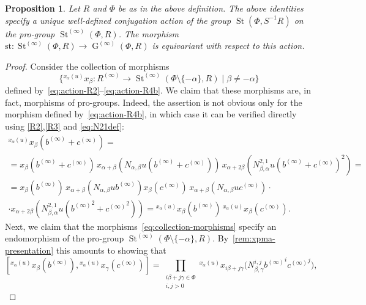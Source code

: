 \documentclass[oneside, 11pt]{amsart}
\numberwithin{equation}{section}
\newtheorem{prop}[lemma]{Proposition}
\theoremstyle{definition}
\theoremstyle{remark}
\DeclareMathOperator\St{St}
\DeclareMathOperator\GG{G}
\newcommand{\up}[2]{{^{#1}\!{#2}}}
\begin{document}
\begin{prop}\label{SteinbergLocalAction}
 Let $R$ and $\Phi$ be as in the above definition.
 The above identities specify a unique well-defined conjugation action of the group \(\St(\Phi, S^{-1} R)\) on the pro-group \(\St^{(\infty)}(\Phi, R)\).
 The morphism \(\mathrm{st} \colon \St^{(\infty)}(\Phi, R) \to \GG^{(\infty)}(\Phi, R)\) is equivariant with respect to this action.
\end{prop}
\begin{proof}
 Consider the collection of morphisms \begin{equation} \label{eq:collection-morphisms} \{\up{x_\alpha(u)} x_\beta \colon R^{(\infty)} \to \St^{(\infty)}(\Phi\setminus\{-\alpha\}, R) \mid \beta \neq - \alpha \}\end{equation} defined by~\eqref{eq:action-R2}--\eqref{eq:action-R4b}. We claim that these morphisms are, in fact, morphisms of pro-groups. Indeed, the assertion is not obvious only for the morphism defined by~\eqref{eq:action-R4b}, in which case it can be verified directly using \eqref{R2},\eqref{R3} and \eqref{eq:N21def}:
 \begin{multline*}
 \up{x_\alpha(u)}{x_\beta(b^{(\infty)} + c^{(\infty)})} = \\
 = x_\beta(b^{(\infty)} + c^{(\infty)})\, x_{\alpha + \beta}(N_{\alpha, \beta} u (b^{(\infty)} + c^{(\infty)}))\, x_{\alpha + 2\beta}(N_{\beta, \alpha}^{2, 1} u (b^{(\infty)} + c^{(\infty)})^2) = \\
 = x_\beta(b^{(\infty)})\, x_{\alpha + \beta}(N_{\alpha, \beta} u b^{(\infty)}) x_\beta(c^{(\infty)})\, x_{\alpha + \beta}(N_{\alpha, \beta} u c^{(\infty)}) \cdot \\
 \cdot x_{\alpha + 2\beta}(N_{\beta, \alpha}^{2, 1} u ({b^{(\infty)}}^2 + {c^{(\infty)}}^2)) = \up{x_\alpha(u)}{x_\beta(b^{(\infty)})}\, \up{x_\alpha(u)}{x_\beta(c^{(\infty)})}.
 \end{multline*}
 Next, we claim that the morphisms~\eqref{eq:collection-morphisms} specify an endomorphism of the pro-group $\St^{(\infty)}(\Phi\setminus\{-\alpha\}, R)$. By~\cref{rem:xpma-presentation} this amounts to showing that \begin{equation}\label{eq:main-equation}[\up{x_\alpha(u)}{x_\beta(b^{(\infty)})}, \up{x_\alpha(u)}{x_\gamma(c^{(\infty)})}] = \prod_{\substack{i\beta + j\gamma \in \Phi\\ i, j > 0}} \up{x_\alpha(u)}{x_{i\beta + j\gamma}\bigl(N_{\beta, \gamma}^{i, j} {b^{(\infty)}}^i {c^{(\infty)}}^j \bigr)},\end{equation}

\end{proof}
\end{document}

